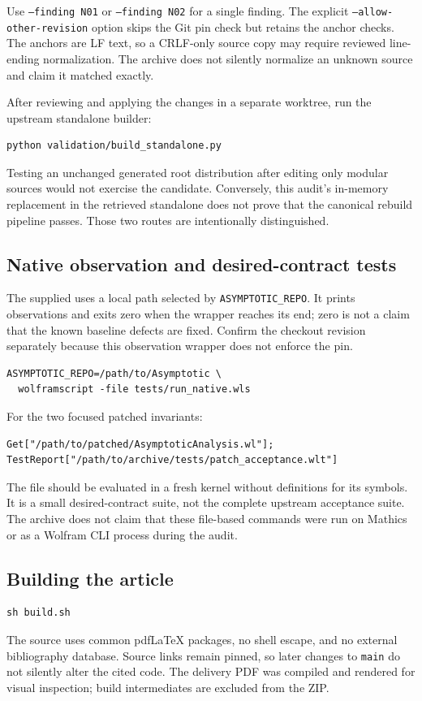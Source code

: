 \documentclass[11pt,a4paper]{article}
\begin{document}
Use \texttt{--finding N01} or \texttt{--finding N02} for a single finding. The explicit \texttt{--allow-other-revision} option skips the Git pin check but retains the anchor checks. The anchors are LF text, so a CRLF-only source copy may require reviewed line-ending normalization. The archive does not silently normalize an unknown source and claim it matched exactly.

After reviewing and applying the changes in a separate worktree, run the upstream standalone builder:
\begin{lstlisting}
python validation/build_standalone.py
\end{lstlisting}
Testing an unchanged generated root distribution after editing only modular sources would not exercise the candidate. Conversely, this audit's in-memory replacement in the retrieved standalone does not prove that the canonical rebuild pipeline passes. Those two routes are intentionally distinguished.

\subsection{Native observation and desired-contract tests}
The supplied  uses a local path selected by \texttt{ASYMPTOTIC\_REPO}. It prints observations and exits zero when the wrapper reaches its end; zero is not a claim that the known baseline defects are fixed. Confirm the checkout revision separately because this observation wrapper does not enforce the pin.
\begin{lstlisting}
ASYMPTOTIC_REPO=/path/to/Asymptotic \
  wolframscript -file tests/run_native.wls
\end{lstlisting}
For the two focused patched invariants:
\begin{lstlisting}
Get["/path/to/patched/AsymptoticAnalysis.wl"];
TestReport["/path/to/archive/tests/patch_acceptance.wlt"]
\end{lstlisting}
The file should be evaluated in a fresh kernel without definitions for its symbols. It is a small desired-contract suite, not the complete upstream acceptance suite. The archive does not claim that these file-based commands were run on Mathics or as a Wolfram CLI process during the audit.

\subsection{Building the article}
\begin{lstlisting}
sh build.sh
\end{lstlisting}
The source uses common pdfLaTeX packages, no shell escape, and no external bibliography database. Source links remain pinned, so later changes to \texttt{main} do not silently alter the cited code. The delivery PDF was compiled and rendered for visual inspection; build intermediates are excluded from the ZIP.
\end{document}
